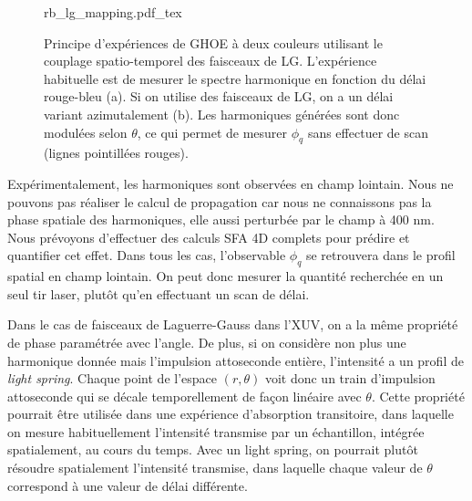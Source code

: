 \begin{figure}[!ht]
\centering
\def\svgwidth{\columnwidth}
{rb_lg_mapping.pdf_tex}
\caption{Principe d'expériences de GHOE à deux couleurs utilisant le couplage spatio-temporel des faisceaux de LG. L'expérience habituelle est de mesurer le spectre harmonique en fonction du délai rouge-bleu (a). Si on utilise des faisceaux de LG, on a un délai variant azimutalement (b). Les harmoniques générées sont donc modulées selon $\theta$, ce qui permet de mesurer $\phi_q$ sans effectuer de scan (lignes pointillées rouges).}
\label{fig:rb_mapping}
\end{figure}
Expérimentalement, les harmoniques sont observées en champ lointain. Nous ne pouvons pas réaliser le calcul de propagation car nous ne connaissons pas la phase spatiale des harmoniques, elle aussi perturbée par le champ à 400 nm. Nous prévoyons d'effectuer des calculs SFA 4D complets pour prédire et quantifier cet effet. Dans tous les cas, l'observable $\phi_q$ se retrouvera dans le profil spatial en champ lointain. On peut donc mesurer la quantité recherchée en un seul tir laser, plutôt qu'en effectuant un scan de délai.

Dans le cas de faisceaux de Laguerre-Gauss dans l'XUV, on a la même propriété de phase paramétrée avec l'angle. De plus, si on considère non plus une harmonique donnée mais l'impulsion attoseconde entière, l'intensité a un profil de \textit{light spring}. Chaque point de l'espace $(r,\theta)$ voit donc un train d'impulsion attoseconde qui se décale temporellement de façon linéaire avec $\theta$. Cette propriété pourrait être utilisée dans une expérience d'absorption transitoire, dans laquelle on mesure habituellement l'intensité transmise par un échantillon, intégrée spatialement, au cours du temps. Avec un light spring, on pourrait plutôt résoudre spatialement l'intensité transmise, dans laquelle chaque valeur de $\theta$ correspond à une valeur de délai différente.

